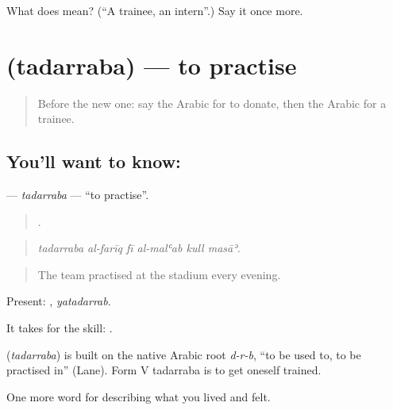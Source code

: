 \begin{tcolorbox}[breakable,colback=teal!4,colframe=teal!35!black,title={Before you move on}]
What does  mean? (\textquotedblleft{}A trainee, an intern\textquotedblright{}.) Say it once more.
\end{tcolorbox}
\section[\texorpdfstring{\ar{تدرب} (tadarraba)}{تدرب (tadarraba)}]{ (tadarraba) — to practise}

\label{lesson:AR-C519-tadarraba}



\begin{quote}
Before the new one: say the Arabic for to donate, then the Arabic for a trainee.
\end{quote}

\subsection*{You'll want to know: }
\textbf{} — \emph{tadarraba} — \textquotedblleft{}to practise\textquotedblright{}.

\begin{quote}
     .
\end{quote}

\begin{quote}
\emph{tadarraba al-farīq fī al-malʿab kull masāʾ.}
\end{quote}

\begin{quote}
The team practised at the stadium every evening.
\end{quote}

Present: , \emph{yatadarrab}.

It takes  for the skill:   .

\begin{cousinweb}
\textbf{} (\emph{tadarraba}) is built on the native Arabic root \emph{d-r-b}, \textquotedblleft{}to be used to, to be practised in\textquotedblright{} (Lane). Form V tadarraba is to get oneself trained.
\end{cousinweb}

\begin{grammarlens}[title={What you've built}]
One more word for describing what you lived and felt.
\end{grammarlens}

